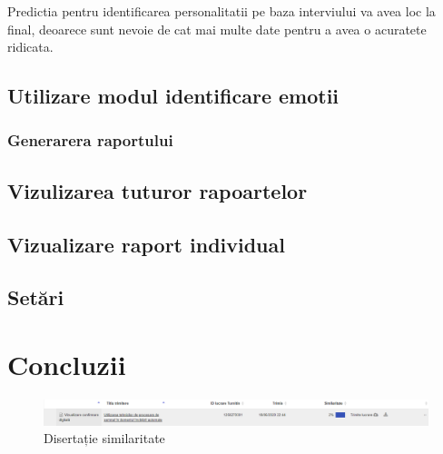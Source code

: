 \documentclass[a4paper, 12pt]{report}
\begin{document}
	Predictia pentru identificarea personalitatii pe baza interviului va avea loc la final, deoarece sunt nevoie de cat mai multe date pentru a avea o acuratete ridicata.
	
	\clearpage
	\subsection{Utilizare modul identificare emotii}
	
	\clearpage
	\subsubsection{Generarera raportului}
	
	\clearpage
	\subsection{Vizulizarea tuturor rapoartelor}
	
	\clearpage
	\subsection{Vizualizare raport individual}
	
	\clearpage
	\subsection{Setări}
	
	\clearpage
	\section{Concluzii}
	
	\clearpage
    \printbibliography
    \clearpage
	\begin{figure}[H]
		\begin{center}
			\includegraphics[scale=0.4]{images/plagiat.PNG}
		\end{center}
		\caption{Disertație similaritate}
		\label{fig:sim}
	\end{figure} 	
\end{document}
